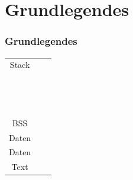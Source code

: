 \documentclass[ddcfooter]{tudbeamer}
\begin{document}
\section{Grundlegendes}
\begin{frame} 
    \frametitle{Grundlegendes}
%	    
%	
   
\renewcommand{\arraystretch}{1.2}
{\tiny
\begin{tabular}{ | c | c | m{5cm} |}
    	\cline{1-1} \cline{3-3} 
	Stack &  &   \\ \cline{1-1} \cline{3-3}
	      &  &   \\ \cline{1-1} \cline{3-3}               &  &   \\ \cline{1-1} \cline{3-3}
	      &  &   \\ \cline{1-1} \cline{3-3}
	      &  &   \\ \cline{1-1} \cline{3-3}
              &  &   \\ \cline{1-1} \cline{3-3}
	      &  &   \\ \cline{1-1} \cline{3-3}
	      &  &   \\ \cline{1-1} \cline{3-3}
	      &  &   \\ \cline{1-1} \cline{3-3}
	      &  &   \\ \cline{1-1} \cline{3-3}
	      &  &   \\ \cline{1-1} \cline{3-3}
	      &  &   \\ \cline{1-1} \cline{3-3}
	      &  &   \\ \cline{1-1} \cline{3-3}
	      &  &   \\ \cline{1-1} \cline{3-3}
	      &  &   \\ \cline{1-1} \cline{3-3}
	BSS   &  &   \\ \cline{1-1} \cline{3-3} 
	Daten &  &   \\ \cline{1-1} \cline{3-3}    
	Daten &  &   \\ \cline{1-1} \cline{3-3} 
	Text  &  &   \\ \cline{1-1} \cline{3-3}  
	
    \end{tabular}
}

\end{frame}
\end{document}
